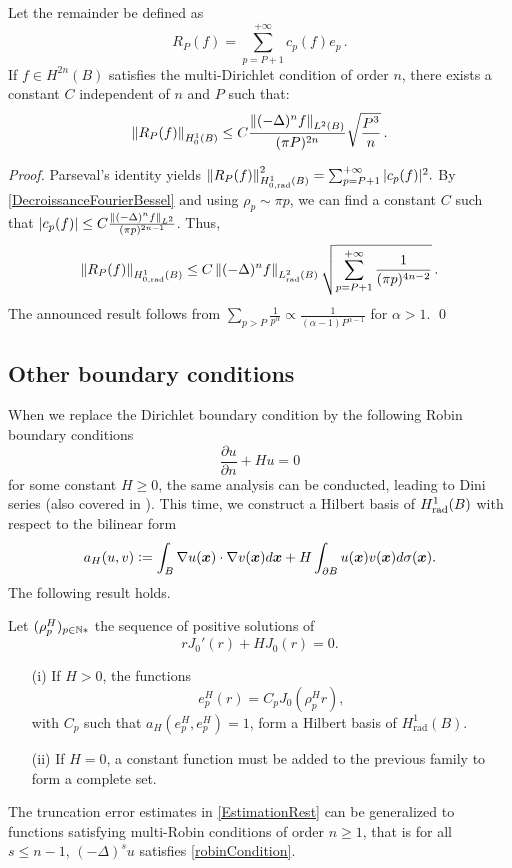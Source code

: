 \documentclass[smallextended]{svjour3}
\begin{document}
\begin{corollary} Let the remainder be defined as 
	\[R_P(f) = \displaystyle\sum_{p = P+1}^{+\infty} c_{p}(f) e_{p}\,.\]
	If $f \in H^{2n}(B)$ satisfies the multi-Dirichlet condition of order $n$, there exists a constant $C$ independent of $n$ and $P$ such that: 
	\[\left\|R_P(f)\right\|_{H^1_0(B)} \leq C\dfrac{\left\|(-\Delta)^n f\right\|_{L^2(B)}}{(\pi P)^{2n}}\sqrt{\dfrac{P^3}{n}}\,.\]
	\label{EstimationRest}
\end{corollary}																												
\begin{proof}
	Parseval's identity yields $\left\|R_P(f)\right\|_{H^1_{0,\textup{rad}}(B)}^2 = \sum_{p=P+1}^{+\infty}|c_p(f)|^2.$
	By \autoref{DecroissanceFourierBessel} and using $\rho_p \sim \pi p$, we can find a constant $C$ such that $\left\lvert c_p(f) \right\rvert \leq C \frac{\left\|(-\Delta)^n f\right\|_{L^2}}{(\pi p)^{2n - 1}}$. Thus, 
	\[\left\|R_P(f)\right\|_{H^1_{0,\textup{rad}}(B)} \leq C \left\|(-\Delta)^n f\right\|_{L^2_{\textup{rad}}(B)}\sqrt{\sum_{p= P+1}^{+\infty} \dfrac{1}{(\pi p)^{4n-2}}}\,.\]
	The announced result follows from $\displaystyle\sum_{p > P} \frac{1}{p^{\alpha}} \propto \frac{1}{(\alpha - 1)P^{\alpha-1}}$ for $\alpha > 1$. 
	\qed
\end{proof}
													
													
\subsection{Other boundary conditions}
\label{Robin}
When we replace the Dirichlet boundary condition by the following Robin boundary conditions
\begin{equation}
	\label{robinCondition}
	\dfrac{\partial u}{\partial n} + H u = 0
\end{equation}
for some constant $H \geq 0$, the same analysis can be conducted, leading to Dini series (also covered in \cite{watson1995treatise}). This time, we construct a Hilbert basis of $H^1_{\textup{rad}}(B)$ with respect to the bilinear form
\[a_H(u,v) \mathrel{\mathop:}= \int_{B} \nabla u(\boldsymbol{x} ) \cdot \nabla v(\boldsymbol{x} ) d\boldsymbol{x} + H \int_{\partial B}{u(\boldsymbol{x} )v(\boldsymbol{x} )}d\sigma(\boldsymbol{x} ).\]
The following result holds. 
\begin{theorem}
	Let $(\rho_p^H)_{p \in \mathbb{N}*}$ the sequence of positive solutions of
	\[r J_0'(r) + H J_0(r) = 0.\]
	\begin{itemize}
		\item[(i)] If $H>0$, the functions 
\[e_p^H(r) = C_p J_0(\rho_p^H r),\]
with $C_p$ such that $a_H(e_p^H,e_p^H) = 1$, form a Hilbert basis of $H^1_{\text{rad}}(B)$. 
		\item[(ii)]If $H = 0$, a constant function must be added to the previous family to form a complete set. 
	\end{itemize}
\end{theorem}
\noindent The truncation error estimates in \autoref{EstimationRest} can be generalized to functions satisfying multi-Robin conditions of order $n \geq 1$, that is for all $s\leq n-1$, $(-\Delta)^s u$ satisfies \eqref{robinCondition}.
\end{document}
